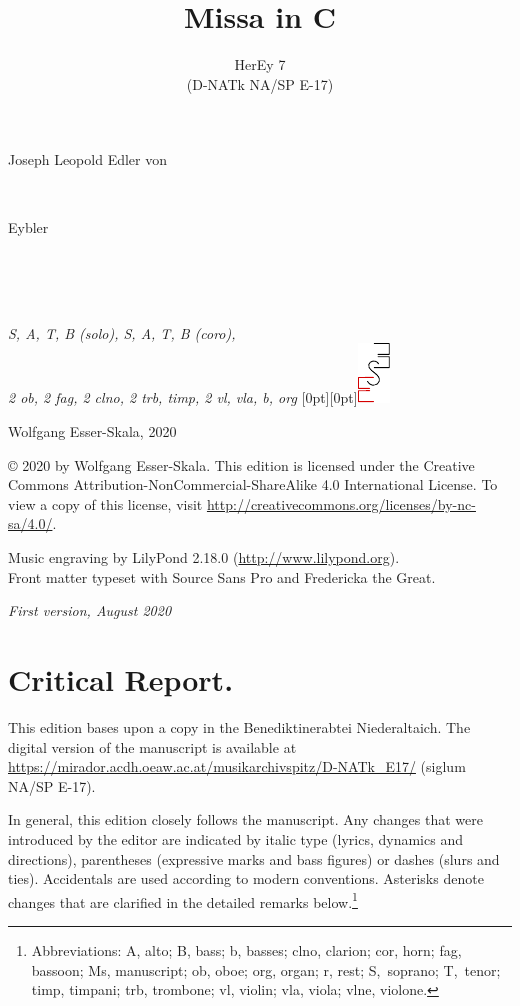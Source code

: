 \documentclass[parskip=full]{scrreprt}
\makeatletter
\DeclareRobustCommand{\sbseries}{\fontseries{sb}\selectfont}
\newcommand\fancytitlehead{
	\headingfont%
	\fontsize{80}{80}\selectfont\textcolor{black!80}{\@ifundefined{@shortname}{\@lastname}{\@shortname}.}\\[15pt]%
	\fontsize{60}{60}\selectfont\@ifundefined{@shorttitle}{\@title}{\@shorttitle}.%
}
\def\firstname#1{\def\@firstname{#1}}
\def\lastname#1{\def\@lastname{#1}}
\def\instrumentation#1{\def\@instrumentation{#1}}
\def\maketitle{%
\begin{titlepage}%
	\Large%
	{\@titlehead}%
	\vfill%
	{\strut\@firstname}\\%
	{\sbseries\color{oldred}\strut\@lastname}\\%
	{\strut\@namesuffix}%
	\vfill%
	{\sbseries\@title}\\%
	{\@subtitle}\\[\baselineskip]%
	{\itshape\@instrumentation}%
	\vfill%
	{\itshape\@parts}\hspace*{\fill}\raisebox{0pt}[0pt][0pt]{\includegraphics{ees_logo}}%
\end{titlepage}%
}
\newif\ifprintreport\printreportfalse
\makeatother
\begin{document}
\frenchspacing

\titlehead{\fancytitlehead}
\firstname{Joseph Leopold Edler von}
\lastname{Eybler}
\title{Missa in C}
\subtitle{HerEy 7\\(D-NATk NA/SP E-17)}
\instrumentation{S, A, T, B (solo), S, A, T, B (coro),\\2 ob, 2 fag, 2 clno, 2 trb, timp, 2 vl, vla, b, org}
\maketitle


\thispagestyle{empty}

\vspace*{\fill}

\hspace*{1em}Wolfgang Esser-Skala, 2020

© 2020 by Wolfgang Esser-Skala. This edition is licensed under the Creative Commons Attribution-NonCommercial-ShareAlike 4.0 International License. To view a copy of this license, visit \url{http://creativecommons.org/licenses/by-nc-sa/4.0/}. 

Music engraving by LilyPond 2.18.0 (\url{http://www.lilypond.org}).\\
Front matter typeset with Source Sans Pro and Fredericka the Great.

\textit{First version, August 2020}

\vspace*{2cm}

\ifprintreport
\chapter*{Critical Report.}

This edition bases upon a copy in the Benediktinerabtei Niederaltaich. The digital version of the manuscript is available at \url{https://mirador.acdh.oeaw.ac.at/musikarchivspitz/D-NATk_E17/} (siglum NA/SP E-17).

In general, this edition closely follows the manuscript. Any changes that were introduced by the editor are indicated by italic type (lyrics, dynamics and directions), parentheses (expressive marks and bass figures) or dashes (slurs and ties). Accidentals are used according to modern conventions. Asterisks denote changes that are clarified in the detailed remarks below.\footnote{Abbreviations: A, alto; B, bass; b, basses; clno, clarion; cor, horn; fag, bassoon; Ms, manuscript; ob, oboe; org, organ; r, rest; S,~soprano; T,~tenor; timp, timpani; trb, trombone; vl, violin; vla, viola; vlne, violone.}
\end{document}
